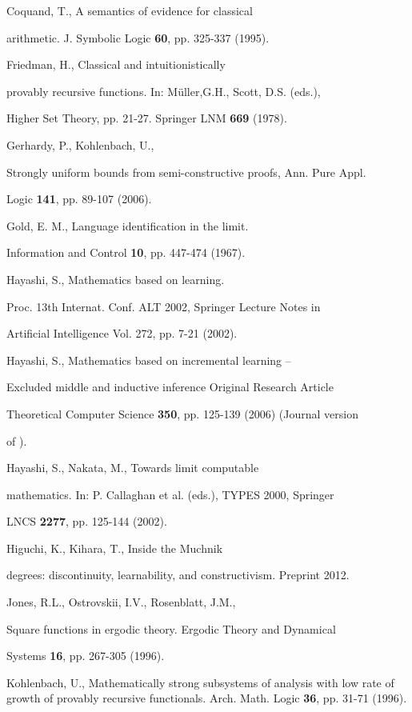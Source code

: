 \documentclass[1p]{elsarticle}
\theoremstyle{plain}
\theoremstyle{definition}
\theoremstyle{remark}
\theoremstyle{definition}
\begin{document}
{\begin{thebibliography}{00}
 Coquand, T., A semantics of evidence for classical

arithmetic. J. Symbolic Logic {\bf 60}, pp. 325-337 (1995).

 Friedman, H., Classical and intuitionistically

provably recursive functions. In: M\"uller,G.H., Scott, D.S. (eds.),

Higher Set Theory, pp. 21-27. Springer LNM {\bf 669} (1978).


Gerhardy, P., Kohlenbach, U.,  

Strongly uniform bounds from semi-constructive proofs, Ann. Pure Appl. 

Logic {\bf 141}, pp. 89-107 (2006).

 Gold, E. M., Language identification in the limit.

Information and Control {\bf 10}, pp. 447-474 (1967).

 Hayashi, S., Mathematics based on learning.

Proc. 13th Internat. Conf. ALT 2002, Springer Lecture Notes in 

Artificial Intelligence Vol. 272, pp. 7-21 (2002).

 Hayashi, S., Mathematics based on incremental learning -- 

Excluded middle and inductive inference Original Research Article

Theoretical Computer Science {\bf 350}, pp. 125-139 (2006) (Journal version 

of \cite{Hayashi02}).

 Hayashi, S., Nakata, M., Towards limit computable 

mathematics. In: P. Callaghan et al. (eds.), TYPES 2000, Springer 

LNCS {\bf 2277}, pp. 125-144 (2002).

 Higuchi, K., Kihara, T., Inside the Muchnik 

degrees: discontinuity, learnability, and constructivism. Preprint 2012. 

 Jones, R.L., Ostrovskii, I.V., Rosenblatt, J.M., 

Square functions in ergodic theory. Ergodic Theory and Dynamical 

Systems {\bf 16}, pp. 267-305 (1996).

 Kohlenbach, U., Mathematically strong subsystems of analysis with low rate of growth of provably recursive functionals. Arch. Math. Logic {\bf 36}, pp. 31-71 (1996). 


\end{thebibliography}}
\end{document}
